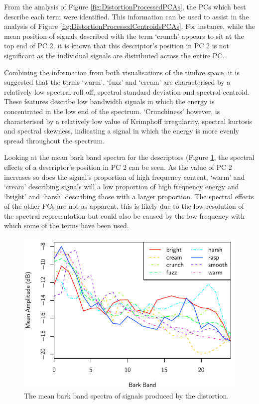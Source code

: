			From the analysis of Figure \ref{fig:DistortionProcessedPCAs}, the PCs which best describe each
			term were identified. This information can be used to assist in the analysis of Figure
			\ref{fig:DistortionProcessedCentroidsPCAs}. For instance, while the mean position of signals
			described with the term `crunch' appears to sit at the top end of PC 2, it is known that this
			descriptor's position in PC 2 is not significant as the individual signals are distributed across
			the entire PC.

			Combining the information from both visualisations of the timbre space, it is suggested that the
			terms `warm', `fuzz' and `cream' are characterised by a relatively low spectral roll off, spectral
			standard deviation and spectral centroid. These features describe low bandwidth signals in which
			the energy is concentrated in the low end of the spectrum. `Crunchiness' however, is characterised
			by a relatively low value of Krimphoff irregularity, spectral kurtosis and spectral skewness,
			indicating a signal in which the energy is more evenly spread throughout the spectrum.

			Looking at the mean bark band spectra for the descriptors (Figure
			\ref{fig:DistortionProcessedSpectra}, the spectral effects of a descriptor's position in PC 2 can
			be seen. As the value of PC 2 increases so does the signal's proportion of high frequency content,
			`warm' and `cream' describing signals will a low proportion of high frequency energy and `bright'
			and `harsh' describing those with a larger proportion. The spectral effects of the other PCs are
			not as apparent, this is likely due to the low resolution of the spectral representation but could
			also be caused by the low frequency with which some of the terms have been used.

			\begin{figure}[h!]
				\centering
				\includegraphics{chapter4/Images/DistortionProcessedSpectra.pdf}
				\caption{The mean bark band spectra of signals produced by the distortion.}
				\label{fig:DistortionProcessedSpectra}
			\end{figure}


